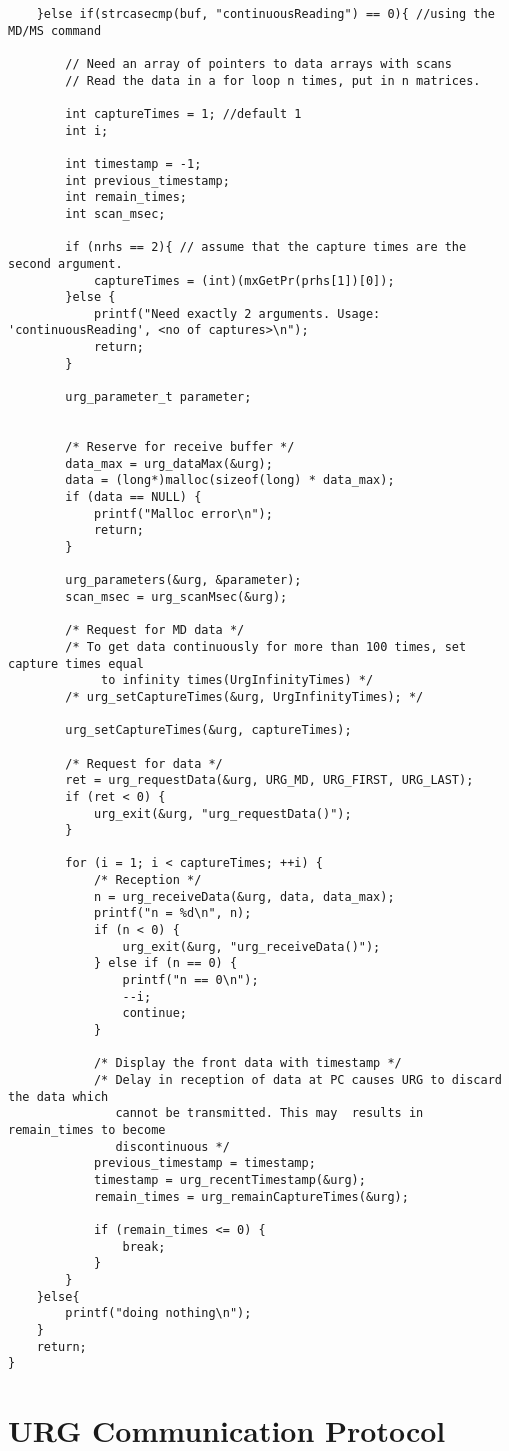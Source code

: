 \begin{lstlisting}
    }else if(strcasecmp(buf, "continuousReading") == 0){ //using the MD/MS command

    	// Need an array of pointers to data arrays with scans
    	// Read the data in a for loop n times, put in n matrices.

    	int captureTimes = 1; //default 1
    	int i;

		int timestamp = -1;
    	int previous_timestamp;
    	int remain_times;
		int scan_msec;

    	if (nrhs == 2){ // assume that the capture times are the second argument.
    		captureTimes = (int)(mxGetPr(prhs[1])[0]);
    	}else {
    		printf("Need exactly 2 arguments. Usage: 'continuousReading', <no of captures>\n");
    		return;
    	}

    	urg_parameter_t parameter;


    	/* Reserve for receive buffer */
    	data_max = urg_dataMax(&urg);
    	data = (long*)malloc(sizeof(long) * data_max);
    	if (data == NULL) {
    		printf("Malloc error\n");
    		return;
    	}

    	urg_parameters(&urg, &parameter);
    	scan_msec = urg_scanMsec(&urg);

    	/* Request for MD data */
    	/* To get data continuously for more than 100 times, set capture times equal
    	     to infinity times(UrgInfinityTimes) */
    	/* urg_setCaptureTimes(&urg, UrgInfinityTimes); */

    	urg_setCaptureTimes(&urg, captureTimes);

    	/* Request for data */
    	ret = urg_requestData(&urg, URG_MD, URG_FIRST, URG_LAST);
    	if (ret < 0) {
    		urg_exit(&urg, "urg_requestData()");
    	}

    	for (i = 1; i < captureTimes; ++i) {
    		/* Reception */
    		n = urg_receiveData(&urg, data, data_max);
    		printf("n = %d\n", n);
    		if (n < 0) {
    			urg_exit(&urg, "urg_receiveData()");
    		} else if (n == 0) {
    			printf("n == 0\n");
    			--i;
    			continue;
    		}

    		/* Display the front data with timestamp */
    		/* Delay in reception of data at PC causes URG to discard the data which
    	       cannot be transmitted. This may  results in remain_times to become
    	       discontinuous */
    		previous_timestamp = timestamp;
    		timestamp = urg_recentTimestamp(&urg);
    		remain_times = urg_remainCaptureTimes(&urg);

    		if (remain_times <= 0) {
    			break;
    		}
    	}
    }else{
    	printf("doing nothing\n");
    }
    return;
}
\end{lstlisting}


\chapter{URG Communication Protocol}


